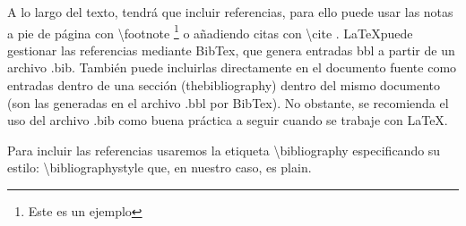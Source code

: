 \documentclass[paper=a4, fontsize=11pt]{scrartcl} %
\numberwithin{equation}{section} %
\numberwithin{figure}{section} %
\numberwithin{table}{section} %
\begin{document}
A lo largo del texto, tendrá que incluir referencias, para ello puede usar las notas a pie de página con \textbackslash footnote \footnote{Este es un ejemplo} o añadiendo citas con \textbackslash cite \cite{1,2}. \LaTeX puede gestionar las referencias mediante BibTex, que genera entradas bbl a partir de un archivo .bib. También puede incluirlas directamente en el documento fuente como entradas dentro de una sección (thebibliography) dentro del mismo documento (son las generadas en el archivo .bbl por BibTex). No obstante, se recomienda el uso del archivo .bib como buena práctica a seguir cuando se trabaje con \LaTeX.

Para incluir las referencias usaremos la etiqueta \textbackslash bibliography especificando su estilo: \textbackslash bibliographystyle que, en nuestro caso, es plain.
\end{document}
